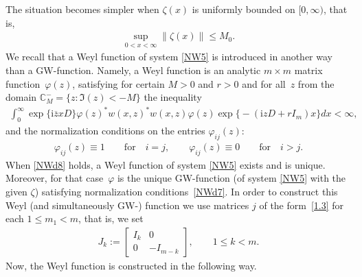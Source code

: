 \documentclass[11pt]{article}
\def\vp{\varphi}
\def\BC{{\mathbb C}}
\newcommand{\I}{\mathrm{i}}
\numberwithin{equation}{section}
\begin{document}
The situation becomes simpler when
$\zeta(x)$ is uniformly bounded on $[0, \infty)$, that is,
\begin{gather}
  \sup\limits_{0 < x < \infty}
   \bigl\| \zeta (x) \bigr\|
 \leq M_0 .
 \label{NWd8}
\end{gather}
We recall that  a Weyl function of system \eqref{NW5} is introduced in another way
than a GW-function. Namely, a Weyl function
 is an analytic $m \times m$ matrix function~$\varphi (z)$,
satisfying for certain
$M > 0$
and
$r > 0$
and for all~$z$
from the domain
$\BC^{-}_M = \{ z \colon \Im(z) < - M \}$
the inequality
\begin{gather}
  \int_0^\infty
      \exp \{\I \overline z x D \}
     \varphi (z)^*
     w (x,z)^*
     w (x,z)
     \varphi (z)
     \exp
      \bigl\{{-}
        (\I z D + r I_m )x
      \bigr\}
  dx
 < \infty,
 \label{NWd6}
\end{gather}
and the normalization conditions on the entries $\varphi_{ij} (z)$:
\begin{gather}
   \varphi_{ij} (z) \equiv 1 \qquad \mbox{for} \quad i= j, \qquad
   \varphi_{ij} (z) \equiv 0 \qquad \mbox{for} \quad i > j.
 \label{NWd7}
\end{gather}
When \eqref{NWd8} holds,
a Weyl function of system \eqref{NW5} exists and is unique.
Moreover, for that case~$\vp$ is the unique GW-function (of system \eqref{NW5} with the given $\zeta$)
satisfying normalization conditions~\eqref{NWd7}. In order to construct this Weyl (and simultaneously GW-) function
we use matrices $j$ of the form~\eqref{1.3} for each $1\leq m_1 < m$, that is, we set
\begin{gather*}
J_k:= \left[
     \begin{matrix}
       I_k & 0   \\
       0 & -I_{m-k}
     \end{matrix}
    \right], \qquad   1\leq k < m.
\end{gather*}
Now, the Weyl function is constructed \cite[pp.~103--106]{SaSaR}
in the following way.
\end{document}
